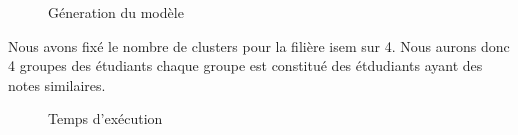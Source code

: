 \documentclass{article}
\begin{document}
            \begin{figure}[h!]
                \centering
                \caption{Géneration du modèle }
                \label{fig:20}
            \end{figure}  
            \newpage Nous avons fixé le nombre de clusters pour la filière isem sur 4.  Nous aurons donc 4 groupes des étudiants chaque groupe est constitué des étdudiants ayant des notes similaires.
            \begin{figure}[h!]
                \centering
                \caption{Temps d’exécution}
                \label{fig:21}
            \end{figure} 
\end{document}
